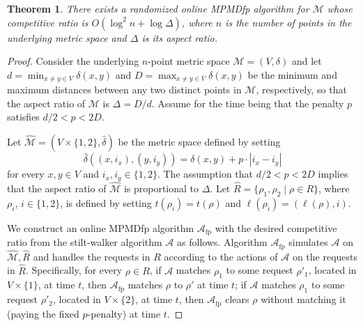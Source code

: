 \documentclass[11pt]{article}
\newtheorem{theorem}{Theorem}[section]
\theoremstyle{definition}
\theoremstyle{plain}
\newtheorem{theorem}{Theorem}
\theoremstyle{definition}
\theoremstyle{plain}
\newtheorem{theorem}{Theorem}[section]
\theoremstyle{definition}
\theoremstyle{plain}
\newcommand{\Location}{\ell}
\newcommand{\aTime}{\mathit{t}}
\newcommand{\A}{\mathcal{A}}
\begin{document}
\begin{theorem}
There exists a randomized online MPMDfp algorithm for $\mathcal{M}$ whose
competitive ratio is
$O \left( \log^{2} n + \log \Delta \right)$,
where $n$ is the number of points in the underlying metric space and $\Delta$
is its aspect ratio.
\end{theorem}
%
\begin{proof}
Consider the underlying $n$-point metric space
$\mathcal{M} = (V, \delta)$
and let
$d = \min_{x \neq y \in V} \delta(x, y)$
and
$D = \max_{x \neq y \in V} \delta(x, y)$
be the minimum and maximum distances between any two distinct points in
$\mathcal{M}$, respectively, so that the aspect ratio of $\mathcal{M}$ is
$\Delta = D / d$.
Assume for the time being that the penalty $p$ satisfies
$d / 2 < p < 2 D$.

Let
$\widehat{\mathcal{M}} = (V \times \{ 1, 2 \}, \widehat{\delta})$
be the metric space defined by setting
\[
\widehat{\delta}((x, i_{x}), (y, i_{y}))
=
\delta(x, y) + p \cdot |i_{x} - i_{y}|
\]
for every
$x, y \in V$
and
$i_{x}, i_{y} \in \{ 1, 2 \}$.
The assumption that
$d / 2 < p < 2 D$
implies that the aspect ratio of $\widehat{\mathcal{M}}$ is proportional to
$\Delta$.
Let
$\widehat{R} = \{ \rho_{1}, \rho_{2} \mid \rho \in R \}$,
where $\rho_{i}$, $i \in \{ 1, 2 \}$, is defined by setting
$\aTime(\rho_{i}) = \aTime(\rho)$
and
$\Location(\rho_{i}) = (\Location(\rho), i)$.

We construct an online MPMDfp algorithm $\A_{\text{fp}}$ with the desired
competitive ratio from the stilt-walker algorithm $\A$ as follows.
Algorithm $\A_{\text{fp}}$ simulates $\A$ on
$\widehat{\mathcal{M}}, \widehat{R}$
and handles the requests in $R$ according to the actions of $\A$ on the
requests in $\widehat{R}$.
Specifically, for every
$\rho \in R$,
if $\A$ matches $\rho_{1}$ to some request $\rho'_{1}$, located in
$V \times \{ 1 \}$,
at time $t$, then $\A_{\text{fp}}$ matches $\rho$ to $\rho'$ at time $t$;
if $\A$ matches $\rho_{1}$ to some request $\rho'_{2}$, located in
$V \times \{ 2 \}$, at time $t$, then $\A_{\text{fp}}$ clears $\rho$ without
matching it (paying the fixed $p$-penalty) at time $t$.


\end{proof}
\end{document}
